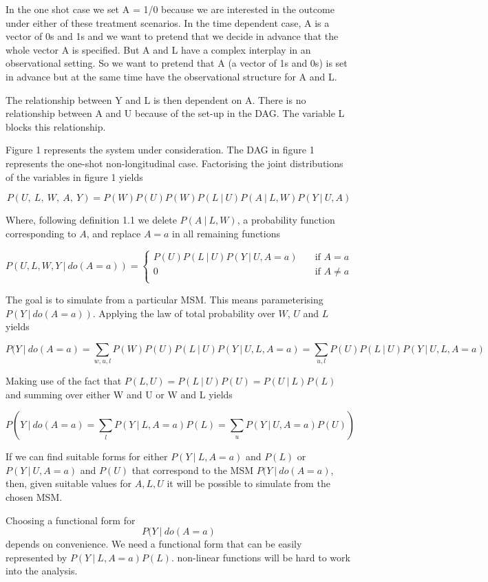 \documentclass[11pt]{article}
\begin{document}
In the one shot case we set A = 1/0 because we are interested in the
outcome under either of these treatment scenarios. In the time dependent
case, A is a vector of 0s and 1s and we want to pretend that we decide
in advance that the whole vector A is specified. But A and L have a
complex interplay in an observational setting. So we want to pretend
that A (a vector of 1s and 0s) is set in advance but at the same time
have the observational structure for A and L.

The relationship between Y and L is then dependent on A. There is no
relationship between A and U because of the set-up in the DAG. The
variable L blocks this relationship.

Figure 1 represents the system under consideration. The DAG in figure 1
represents the one-shot non-longitudinal case. Factorising the joint
distributions of the variables in figure 1 yields

\[P(U,\ L,\ W,\ A,\ Y) = P(W)P(U)P(W)P(L\ |\ U)P(A\ |\ L,W)P(Y\ |\ U,A)\]

Where, following definition 1.1 we delete \(P(A\ |\ L,W)\), a
probability function corresponding to \(A\), and replace \(A=a\) in all
remaining functions

\[ P(U, L, W, Y\ |\ do(A=a)) =
  \begin{cases}
    P(U)P(L\ |\ U)P(Y\ |\ U,A = a) & \quad \text{if } A = a\\
    0  & \quad \text{if } A \neq a\\
  \end{cases}
\]

The goal is to simulate from a particular MSM. This means parameterising
\(P(Y\ |\ do(A=a))\). Applying the law of total probability over \(W\),
\(U\) and \(L\) yields

\[P(Y\ |\ do(A=a) = \sum_{w, u, l} P(W)P(U)P(L\ |\ U)P(Y\ |\ U, L, A=a) = \sum_{u, l} P(U)P(L\ |\ U)P(Y\ |\ U, L, A=a)\]

Making use of the fact that
\(P(L, U) = P(L\ |\  U)P(U) = P(U\ |\ L)P(L)\) and summing over either W
and U or W and L yields

\[P(Y\ |\ do(A=a) = \sum_{l}P(Y\ |\ L, A=a)P(L) = \sum_{u} P(Y\ |\ U, A=a)P(U))\]

If we can find suitable forms for either \(P(Y\ |\ L, A=a)\) and
\(P(L)\) or \(P(Y\ |\ U, A=a)\) and \(P(U)\) that correspond to the MSM
\(P(Y\ |\ do(A=a)\), then, given suitable values for \(A, L, U\) it will
be possible to simulate from the chosen MSM.

Choosing a functional form for \[P(Y\ |\ do(A=a)\] depends on
convenience. We need a functional form that can be easily represented by
\(P(Y\ |\ L, A=a)P(L)\). non-linear functions will be hard to work into
the analysis.
\end{document}
